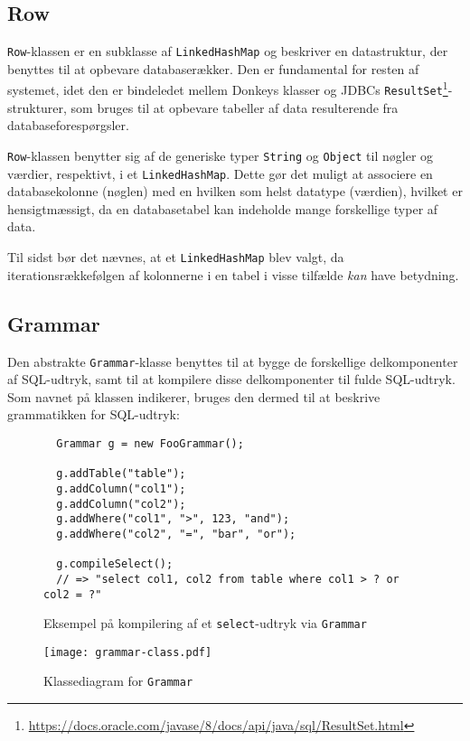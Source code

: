 \subsection{Row}

\texttt{Row}-klassen er en subklasse af \texttt{Linked\-Hash\-Map} og beskriver en datastruktur, der benyttes til at opbevare databaserækker. Den er fundamental for resten af systemet, idet den er bindeledet mellem Donkeys klasser og JDBCs \texttt{Result\-Set}\footnote{\url{https://docs.oracle.com/javase/8/docs/api/java/sql/ResultSet.html}}-strukturer, som bruges til at opbevare tabeller af data resulterende fra databaseforespørgsler.

\texttt{Row}-klassen benytter sig af de generiske typer \texttt{String} og \texttt{Object} til nøgler og værdier, respektivt, i et \texttt{Linked\-Hash\-Map}. Dette gør det muligt at associere en databasekolonne (nøglen) med en hvilken som helst datatype (værdien), hvilket er hensigtmæssigt, da en databasetabel kan indeholde mange forskellige typer af data.

Til sidst bør det nævnes, at et \texttt{Linked\-Hash\-Map} blev valgt, da iterationsrækkefølgen af kolonnerne i en tabel i visse tilfælde \textit{kan} have betydning.

\subsection{Grammar}

Den abstrakte \texttt{Grammar}-klasse benyttes til at bygge de forskellige delkomponenter af SQL-udtryk, samt til at kompilere disse delkomponenter til fulde SQL-udtryk. Som navnet på klassen indikerer, bruges den dermed til at beskrive grammatikken for SQL-udtryk:

\begin{figure}[h]
  \begin{verbatim}
  Grammar g = new FooGrammar();

  g.addTable("table");
  g.addColumn("col1");
  g.addColumn("col2");
  g.addWhere("col1", ">", 123, "and");
  g.addWhere("col2", "=", "bar", "or");
  
  g.compileSelect();
  // => "select col1, col2 from table where col1 > ? or col2 = ?"
  \end{verbatim}
  \caption{Eksempel på kompilering af et \texttt{select}-udtryk via \texttt{Grammar}}
  \label{code-example:grammar-select-compilation}
\end{figure}

\begin{wrapfigure}{r}{0.35\textwidth}
  \centering
  \vspace{-12pt}
  \texttt{[image: grammar-class.pdf]}
  \caption{Klassediagram for \texttt{Grammar}}
  \label{class-diagram:grammar-class}
\end{wrapfigure}

